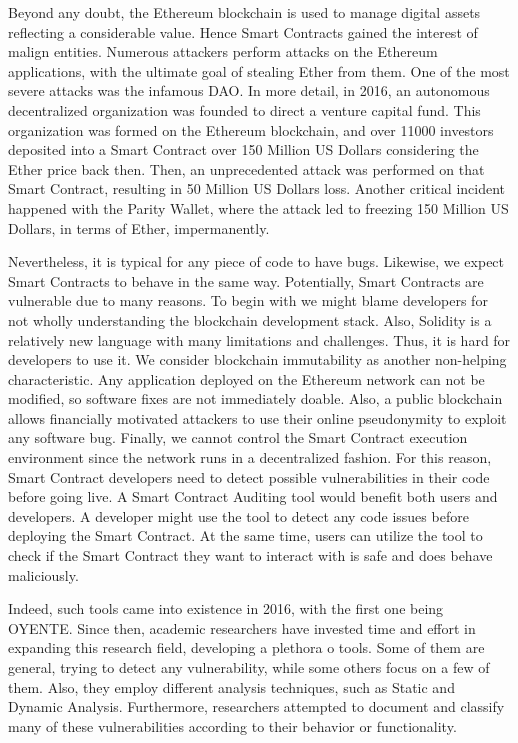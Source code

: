 \documentclass[a4paper,11pt]{article}
\begin{document}
Beyond any doubt, the Ethereum blockchain is used to manage digital assets
reflecting a considerable value. Hence Smart Contracts gained the interest of
malign entities. Numerous attackers perform attacks on the Ethereum
applications, with the ultimate goal of stealing Ether from them. One of the
most severe attacks was the infamous DAO\cite{dao}. In more detail, in 2016, an
autonomous decentralized organization was founded to direct a venture capital
fund. This organization was formed on the Ethereum blockchain, and over 11000
investors deposited into a Smart Contract over 150 Million US Dollars\cite{dao}
considering the Ether price back then. Then, an unprecedented
attack\cite{reentrancy} was performed on that Smart Contract, resulting in 50
Million US Dollars loss. Another critical incident happened with the Parity
Wallet\cite{parity}, where the attack led to freezing 150 Million US Dollars, in
terms of Ether, impermanently.

Nevertheless, it is typical for any piece of code to have bugs. Likewise, we
expect Smart Contracts to behave in the same way. Potentially, Smart Contracts
are vulnerable due to many reasons. To begin with we might blame developers for
not wholly understanding the blockchain development
stack\cite{tikhomirov2018smartcheck}. Also, Solidity is a relatively new
language with many limitations and challenges. Thus, it is hard for developers
to use it\cite{tikhomirov2018smartcheck}. We consider blockchain immutability as
another non-helping characteristic. Any application deployed on the Ethereum
network can not be modified, so software fixes are not immediately
doable\cite{jiang2018contractfuzzer}. Also, a public blockchain allows
financially motivated attackers to use their online pseudonymity to exploit any
software bug\cite{tikhomirov2018smartcheck}. Finally, we cannot control the
Smart Contract execution environment since the network runs in a decentralized
fashion\cite{tikhomirov2018smartcheck}. For this reason, Smart Contract
developers need to detect possible vulnerabilities in their code before going
live. A Smart Contract Auditing tool would benefit both users and developers. A
developer might use the tool to detect any code issues before deploying the
Smart Contract. At the same time, users can utilize the tool to check if the
Smart Contract they want to interact with is safe and does behave maliciously.

Indeed, such tools came into existence in 2016, with the first one being
OYENTE\cite{luu2016making}. Since then, academic researchers have invested time and effort in
expanding this research field, developing a plethora o tools. Some of them are
general, trying to detect any vulnerability, while some others focus on a few of
them. Also, they employ different analysis techniques, such as Static and
Dynamic Analysis. Furthermore, researchers attempted to document and classify
many of these vulnerabilities according to their behavior or functionality.
\end{document}
